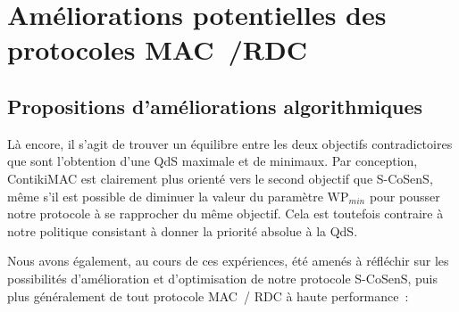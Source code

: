 
\section{Améliorations potentielles des protocoles MAC~/RDC}
\label{SecAmeliorAlgoProtoMAC}


\subsection{Propositions d'améliorations algorithmiques}
\label{SubSecPropoAlgo}

Là encore, il s'agit de trouver un équilibre entre les deux objectifs
contradictoires que sont l'obtention d'une QdS maximale et de  minimaux. Par conception, ContikiMAC est clairement plus orienté
vers le second objectif que S-CoSenS, même s'il est possible de diminuer
la valeur du paramètre $\mathrm{WP}_{min}$ pour pousser notre protocole
à se rapprocher du même objectif. Cela est toutefois contraire à notre
politique consistant à donner la priorité absolue à la QdS.

Nous avons également, au cours de ces expériences, été amenés à réfléchir
sur les possibilités d'amélioration et d'optimisation de notre protocole
S-CoSenS, puis plus généralement de tout protocole MAC~/ RDC à haute
performance~:

